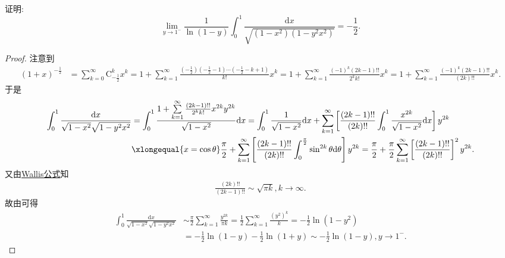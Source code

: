 \documentclass[../../main.tex]{subfiles}
\begin{document}
\begin{example}
证明:
\[
\lim_{y\rightarrow 1^{-}}\frac{1}{\ln(1 - y)}\int_{0}^{1}\frac{\mathrm{d}x}{\sqrt{(1 - x^2)(1 - y^2x^2)}}=-\frac{1}{2}.
\]
\end{example}
\begin{proof}
注意到
\begin{align*}
(1+x)^{-\frac{1}{2}}&=\sum_{k=0}^{\infty}\mathrm{C}_{-\frac{1}{2}}^{k}x^k=1+\sum_{k=1}^{\infty}\frac{\left( -\frac{1}{2} \right) \left( -\frac{1}{2}-1 \right) \cdots \left( -\frac{1}{2}-k+1 \right)}{k!}x^k=1+\sum_{k=1}^{\infty}\frac{(-1)^k(2k-1)!!}{2^kk!}x^k=1+\sum_{k=1}^{\infty}\frac{(-1)^k(2k-1)!!}{(2k)!!}x^k.
\end{align*}
于是
\begin{align*}
\int_0^1\frac{\mathrm{d}x}{\sqrt{1-x^2}\sqrt{1-y^2x^2}}&=\int_0^1\frac{1+\sum\limits_{k=1}^{\infty}\frac{(2k-1)!!}{2^kk!}x^{2k}y^{2k}}{\sqrt{1-x^2}}\mathrm{d}x=\int_0^1\frac{1}{\sqrt{1-x^2}}\mathrm{d}x+\sum_{k=1}^{\infty}\left[ \frac{(2k-1)!!}{(2k)!!}\int_0^1\frac{x^{2k}}{\sqrt{1-x^2}}\mathrm{d}x \right]y^{2k}\\
&\xlongequal{x=\cos \theta}\frac{\pi}{2}+\sum_{k=1}^{\infty}\left[ \frac{(2k-1)!!}{(2k)!!}\int_0^{\frac{\pi}{2}}\sin ^{2k}\theta \mathrm{d}\theta \right]y^{2k}=\frac{\pi}{2}+\frac{\pi}{2}\sum_{k=1}^{\infty}\left[ \frac{(2k-1)!!}{(2k)!!} \right]^2y^{2k}.
\end{align*}
又由\hyperref[theorem:Wallis公式]{Wallis公式}知
\begin{align*}
\frac{(2k)!!}{(2k-1)!!}\sim \sqrt{\pi k},k\rightarrow \infty .
\end{align*}
故由可得
\begin{align*}
\int_0^1\frac{\mathrm{d}x}{\sqrt{1-x^2}\sqrt{1-y^2x^2}}&\sim \frac{\pi}{2}\sum_{k=1}^{\infty}\frac{y^{2k}}{\pi k}=\frac{1}{2}\sum_{k=1}^{\infty}\frac{(y^2)^k}{k}=-\frac{1}{2}\ln(1-y^2)\\
&=-\frac{1}{2}\ln(1-y)-\frac{1}{2}\ln(1+y)\sim -\frac{1}{2}\ln(1-y),y\rightarrow 1^-.
\end{align*}

\end{proof}
\end{document}
